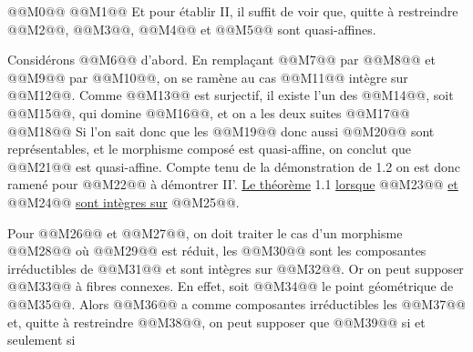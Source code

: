 
@@M0@@
@@M1@@
Et pour établir II, il suffit de voir que, quitte à restreindre @@M2@@, @@M3@@, @@M4@@ et @@M5@@ sont quasi-affines.

Considérons @@M6@@ d'abord. En remplaçant @@M7@@ par @@M8@@ et @@M9@@ par @@M10@@, on se ramène au cas @@M11@@ intègre sur @@M12@@. Comme @@M13@@ est surjectif, il existe l'un des @@M14@@, soit @@M15@@, qui domine @@M16@@, et on a les deux suites
@@M17@@
@@M18@@
Si l'on sait donc que les @@M19@@ donc aussi @@M20@@ sont représentables, et le morphisme composé est quasi-affine, on conclut que @@M21@@ est quasi-affine. Compte tenu de la démonstration de 1.2 on est donc ramené pour @@M22@@ à démontrer II'. \uline{Le théorème} 1.1 \uline{lorsque} @@M23@@ \uline{et} @@M24@@ \uline{sont intègres sur} @@M25@@.

Pour @@M26@@ et @@M27@@, on doit traiter le cas d'un morphisme @@M28@@ où @@M29@@ est réduit, les @@M30@@ sont les composantes irréductibles de @@M31@@ et sont intègres sur @@M32@@. Or on peut supposer @@M33@@ à fibres connexes. En effet, soit @@M34@@ le point géométrique de @@M35@@. Alors @@M36@@ a comme composantes irréductibles les @@M37@@ et, quitte à restreindre @@M38@@, on peut supposer que @@M39@@ si et seulement si

